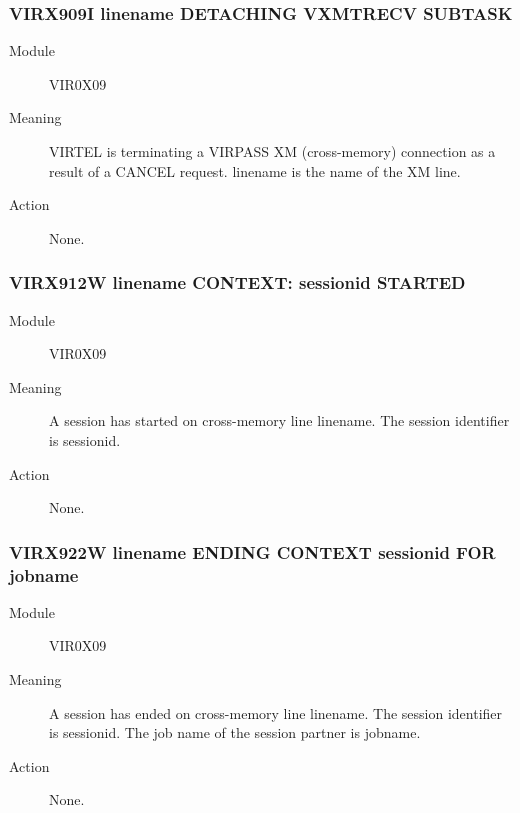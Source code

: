 \documentclass[letterpaper,10pt,english]{sphinxmanual}
\begin{document}
\subsubsection{VIRX909I linename DETACHING VXMTRECV SUBTASK}
\label{\detokenize{messages:virx909i-linename-detaching-vxmtrecv-subtask}}\begin{description}
\item[{Module}] \leavevmode
VIR0X09

\item[{Meaning}] \leavevmode
VIRTEL is terminating a VIRPASS XM (cross-memory) connection as a result of a CANCEL request. linename is the name of the XM line.

\item[{Action}] \leavevmode
None.

\end{description}


\subsubsection{VIRX912W linename CONTEXT: sessionid STARTED}
\label{\detokenize{messages:virx912w-linename-context-sessionid-started}}\begin{description}
\item[{Module}] \leavevmode
VIR0X09

\item[{Meaning}] \leavevmode
A session has started on cross-memory line linename. The session identifier is sessionid.

\item[{Action}] \leavevmode
None.

\end{description}


\subsubsection{VIRX922W linename ENDING CONTEXT sessionid FOR jobname}
\label{\detokenize{messages:virx922w-linename-ending-context-sessionid-for-jobname}}\begin{description}
\item[{Module}] \leavevmode
VIR0X09

\item[{Meaning}] \leavevmode
A session has ended on cross-memory line linename. The session identifier is sessionid. The job name of the session partner is jobname.

\item[{Action}] \leavevmode
None.

\end{description}
\end{document}
